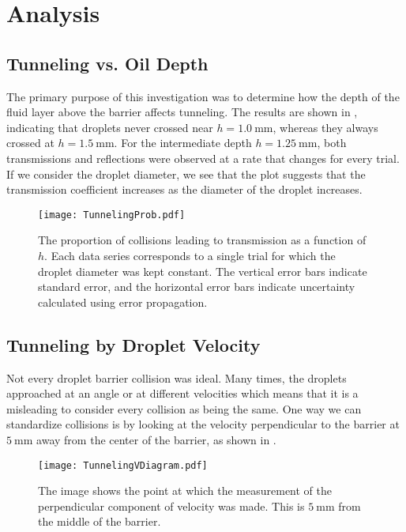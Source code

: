 \renewcommand{\thefootnote}{\arabic{footnote}}
\section{Analysis}


    \subsection{Tunneling vs. Oil Depth}
The primary purpose of this investigation was to determine how the depth of the fluid layer above the barrier affects tunneling. The results are shown in , indicating that droplets never crossed near $h=1.0~\mathrm{mm}$, whereas they always crossed at $h=1.5~\mathrm{mm}$. For the intermediate depth $h=1.25~\mathrm{mm}$, both transmissions and reflections were observed at a rate that changes for every trial. If we consider the droplet diameter, we see that the plot suggests that the transmission coefficient increases as the diameter of the droplet increases. 

\begin{figure}[h!]
	\centering
	\texttt{[image: TunnelingProb.pdf]}
	\caption{The proportion of collisions leading to transmission as a function of $h$. Each data series corresponds to a single trial for which the droplet diameter was kept constant. The vertical error bars indicate standard error, and the horizontal error bars indicate uncertainty calculated using error propagation. }
	\label{tbh}
\end{figure}


    \subsection{Tunneling by Droplet Velocity}
Not every droplet barrier collision was ideal. Many times, the droplets approached at an angle or at different velocities which means that it is a misleading to consider every collision as being the same. One way we can standardize collisions is by looking at the velocity perpendicular to the barrier at $5~\mathrm{mm}$ away from the center of the barrier, as shown in .

\begin{figure}[h!]
	\centering
	\texttt{[image: TunnelingVDiagram.pdf]}
	\caption{The image shows the point at which the measurement of the perpendicular component of velocity was made. This is $5~\mathrm{mm}$ from the middle of the barrier.}
	\label{tvd}
\end{figure}

